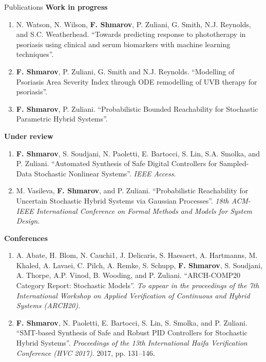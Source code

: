 \documentclass{resume} %
\begin{document}
\begin{rSection}{Publications}
{\bf Work in progress}
\begin{enumerate}
	\item N. Watson, N. Wilson, {\bf F. Shmarov}, P. Zuliani, G. Smith, N.J. Reynolds, and S.C. Weatherhead. 
	``Towards predicting response to phototherapy in psoriasis using clinical and serum biomarkers 
	with machine learning techniques''.

	\item {\bf F. Shmarov}, P. Zuliani, G. Smith and N.J. Reynolds. 
	``Modelling of Psoriasis Area Severity Index through ODE remodelling of UVB therapy for psoriasis''.

	\item {\bf F. Shmarov}, P. Zuliani.
	``Probabilistic Bounded Reachability for Stochastic Parametric Hybrid Systems''.
\end{enumerate}


{\bf Under review}
\begin{enumerate}[resume]
	\item {\bf F. Shmarov}, S. Soudjani, N. Paoletti, E. Bartocci, S. Lin, S.A. Smolka, and P. Zuliani.
	``Automated Synthesis of Safe Digital Controllers for Sampled-Data Stochastic Nonlinear Systems''.
	{\em IEEE Access}.

	\item M. Vasileva, {\bf F. Shmarov}, and P. Zuliani.
	``Probabilistic Reachability for Uncertain Stochastic Hybrid Systems via Gaussian Processes''.
	{\em 18th ACM-IEEE International Conference on Formal Methods and Models for System Design}.
\end{enumerate}


{\bf Conferences}
\begin{enumerate}[resume]
	\item A. Abate, H. Blom, N. Cauchi1, J. Delicaris, S. Haesaert, A. Hartmanns, M. Khaled, A. Lavaei,
	C. Pilch, A. Remke, S. Schupp, {\bf F. Shmarov}, S. Soudjani, A. Thorpe, A.P. Vinod, B. Wooding, 
	and P. Zuliani. ``ARCH-COMP20 Category Report: Stochastic Models''. 
	{\em To appear in the proceedings of the 7th International Workshop on Applied 
	Verification of Continuous and Hybrid Systems (ARCH20).}

	\item {\bf F. Shmarov}, N. Paoletti, E. Bartocci, S. Lin, S. Smolka, and P. Zuliani. 
	``SMT-based Synthesis of Safe and Robust PID Controllers for Stochastic Hybrid Systems''.
	{\em Proceedings of the 13th International Haifa Verification Conference (HVC 2017)}. 2017, pp. 131--146.


\end{enumerate}
\end{rSection}
\end{document}
